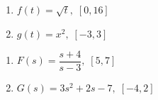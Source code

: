\documentclass{ximera}
\begin{document}
\begin{multicols}{2}
\begin{enumerate}
\setcounter{enumi}{\value{HW}}

\item $f(t) = \sqrt{t}, \; [0, 16]$
\item $g(t) = x^{2}, \; [-3, 3]$

\setcounter{HW}{\value{enumi}}
\end{enumerate}
\end{multicols}

\begin{multicols}{2}
\begin{enumerate}
\setcounter{enumi}{\value{HW}}

\item $F(s) = \dfrac{s + 4}{s - 3}, \; [5, 7]$
\item $G(s) = 3s^{2} + 2s - 7, \; [-4, 2]$  \label{averagerateexerlast}

\setcounter{HW}{\value{enumi}}
\end{enumerate}
\end{multicols}
\end{document}

